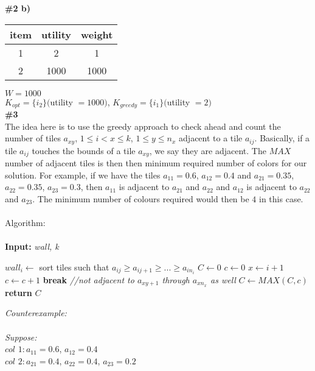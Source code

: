 \documentclass{article}
\begin{document}
\textbf{\#2 b)}\\
\begin{tabular}{|c|c|c| }
 \hline
 item & utility & weight \\
 \hline
 1 & 2 & 1 \\
 \hline
 2 & 1000 & 1000\\
 \hline
\end{tabular}
$W = 1000$
\\$K_{opt} = \{i_2\} ($utility $= 1000)$, $K_{greedy} = \{i_1\} ($utility $= 2)$\\
\textbf{\#3}\\
The idea here is to use the greedy approach to check ahead and count the number of tiles $a_{xy}$, $1 \leq i < x \leq k$, $1 \leq y \leq n_x$ adjacent to a tile $a_{ij}$.  Basically, if a tile $a_{ij}$ touches the bounds of a tile $a_{xy}$, we say they are adjacent. The $MAX$ number of adjacent tiles is then then minimum required number of colors for our solution. For example, if we have the tiles $a_{11} = 0.6$, $a_{12} = 0.4$ and $a_{21} = 0.35$, $a_{22} = 0.35$, $a_{23} = 0.3$, then $a_{11}$ is adjacent to $a_{21}$ and $a_{22}$ and $a_{12}$ is adjacent to $a_{22}$ and $a_{23}$. The minimum number of colours required would then be $4$ in this case.\\\\
Algorithm:\\\\
\textbf{Input:} \textit{wall, k}
\begin{algorithmic}
    \State $wall_i \gets$ sort tiles such that $a_{ij} \geq a_{ij+1} \geq ... \geq a_{in_i}$
  \EndFor
\EndFor
\State $C \gets 0$
  \State $c \gets 0$
    \State $x \gets i+1$
        \State $c \gets c+1$
      \Else
        \State \textbf{break} \textit{ //not adjacent to $a_{xy+1}$ through $a_{xn_{x}}$ as well}
      \EndIf
    \EndFor
  \EndFor
  \State $C \gets MAX(C, c)$
\EndFor
\State \textbf{return} $C$\\
\end{algorithmic}
\textit{Counterexample:}\\
\\\textit{Suppose:}\\
$col$ $1 : a_{11} = 0.6$, $a_{12} = 0.4$\\
$col$ $2 : a_{21} = 0.4$, $a_{22} = 0.4$, $a_{23} = 0.2$\\
\end{document}
